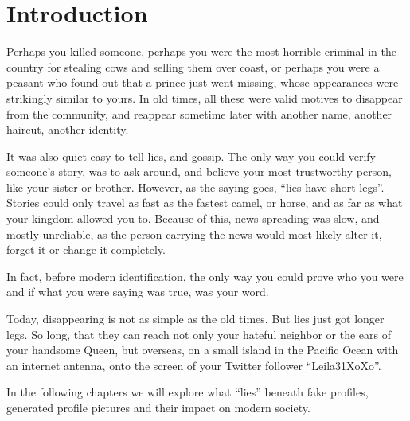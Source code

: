 \section{Introduction}

Perhaps you killed someone, perhaps you were the most horrible criminal in the country for stealing cows and selling them over coast, or perhaps you were a peasant who found out that a prince just went missing, whose appearances were strikingly similar to yours. In old times, all these were valid motives to disappear from the community, and reappear sometime later with another name, another haircut, another identity.

It was also quiet easy to tell lies, and gossip. The only way you could verify someone's story, was to ask around, and believe your most trustworthy person, like your sister or brother. However, as the saying goes, ``lies have short legs''. Stories could only travel as fast as the fastest camel, or horse, and as far as what your kingdom allowed you to. Because of this, news spreading was slow, and mostly unreliable, as the person carrying the news would most likely alter it, forget it or change it completely.

In fact, before modern identification, the only way you could prove who you were and if what you were saying was true, was your word.

Today, disappearing is not as simple as the old times. But lies just got longer legs. So long, that they can reach not only your hateful neighbor or the ears of your handsome Queen, but overseas, on a small island in the Pacific Ocean with an internet antenna, onto the screen of your Twitter follower ``Leila31XoXo''.

In the following chapters we will explore what ``lies'' beneath fake profiles, generated profile pictures and their impact on modern society.


